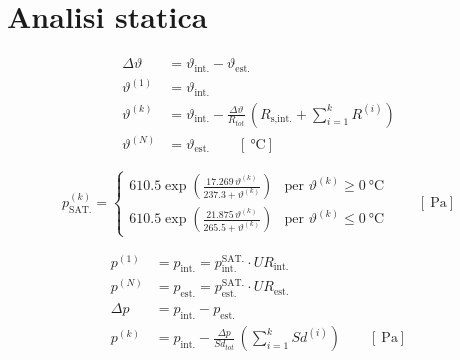 \chapter{Analisi statica}
\begin{align*}
    \Delta\vartheta &= \vartheta_{\text{int.}} - \vartheta_{\text{est.}} \\
    \vartheta^{(1)} &= \vartheta_{\text{int.}} \\
    \vartheta^{(k)} &= \vartheta_{\text{int.}} - \frac{\Delta\vartheta}{R_{tot}} \, \left(R_{\text{s,int.}} + \sum_{i=1}^{k}R^{(i)}\right) \\
    \vartheta^{(N)} &= \vartheta_{\text{est.}} \qquad \left[\SI{}{\celsius}\right]
\end{align*}

\begin{equation}
    p^{(k)}_{\text{SAT.}} =
    \begin{cases}
            610.5\exp\left(\frac{17.269\,\vartheta^{(k)}}{237.3 + \vartheta^{(k)}}\right) & \text{per $\vartheta^{(k)}\geq \SI{0}{\celsius}$}\\ 
            610.5\exp\left(\frac{21.875\,\vartheta^{(k)}}{265.5 + \vartheta^{(k)}}\right) & \text{per $\vartheta^{(k)} \leq  \SI{0}{\celsius}$}
    \end{cases}
    \qquad \left[\SI{}{\pascal}\right]
\end{equation}

\begin{align*}
    p^{(1)} &= p_{\text{int.}} = p^{\text{SAT.}}_{\text{int.}} \cdot UR_{\text{int.}}\\
    p^{(N)} &= p_{\text{est.}} = p^{\text{SAT.}}_{\text{est.}} \cdot UR_{\text{est.}}\\
    \Delta p &= p_{\text{int.}} - p_{\text{est.}} \\
    p^{(k)} &= p_{\text{int.}} - \frac{\Delta p}{Sd_{tot}} \, \left(\sum_{i=1}^{k} Sd^{(i)} \right) \qquad \left[\SI{}{\pascal}\right]
\end{align*}